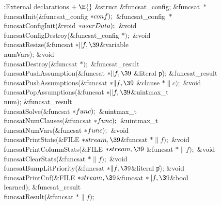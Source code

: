 {{{{{\Y\B\4:External declarations\X${}\mathrel+\E{}$\6
\&{struct} \&{funcsat\_config};\6
\&{funcsat} ${}{*}{}$\\{funcsatInit}(\&{funcsat\_config} ${}{*}\\{conf});{}$\6
\&{funcsat\_config} ${}{*}{}$\\{funcsatConfigInit}(\&{void} ${}{*}%
\\{userData});{}$\6
\&{void} \\{funcsatConfigDestroy}(\&{funcsat\_config} ${}{*});{}$\6
\&{void} \\{funcsatResize}(\&{funcsat} ${}{*}\|f,\39{}$\&{variable} %
\\{numVars});\6
\&{void} \\{funcsatDestroy}(\&{funcsat} ${}{*});{}$\6
\&{funcsat\_result} \\{funcsatPushAssumption}(\&{funcsat} ${}{*}\|f,\39{}$%
\&{literal} \|p);\6
\&{funcsat\_result} \\{funcsatPushAssumptions}(\&{funcsat} ${}{*}\|f,\39{}$%
\&{clause} ${}{*}\|c);{}$\6
\&{void} \\{funcsatPopAssumptions}(\&{funcsat} ${}{*}\|f,\39{}$\&{uintmax\_t} %
\\{num});\6
\&{funcsat\_result} \\{funcsatSolve}(\&{funcsat} ${}{*}\\{func});{}$\6
\&{uintmax\_t} \\{funcsatNumClauses}(\&{funcsat} ${}{*}\\{func});{}$\6
\&{uintmax\_t} \\{funcsatNumVars}(\&{funcsat} ${}{*}\\{func});{}$\6
\&{void} \\{funcsatPrintStats}(\&{FILE} ${}{*}\\{stream},\39{}$\&{funcsat}
${}{*}\|f);{}$\6
\&{void} \\{funcsatPrintColumnStats}(\&{FILE} ${}{*}\\{stream},\39{}$%
\&{funcsat} ${}{*}\|f);{}$\6
\&{void} \\{funcsatClearStats}(\&{funcsat} ${}{*}\|f);{}$\6
\&{void} \\{funcsatBumpLitPriority}(\&{funcsat} ${}{*}\|f,\39{}$\&{literal} %
\|p);\6
\&{void} \\{funcsatPrintCnf}(\&{FILE} ${}{*}\\{stream},\39{}$\&{funcsat} ${}{*}%
\|f,\39{}$\&{bool} \\{learned});\6
\&{funcsat\_result} \\{funcsatResult}(\&{funcsat} ${}{*}\|f);{}$\6
}}}}}
